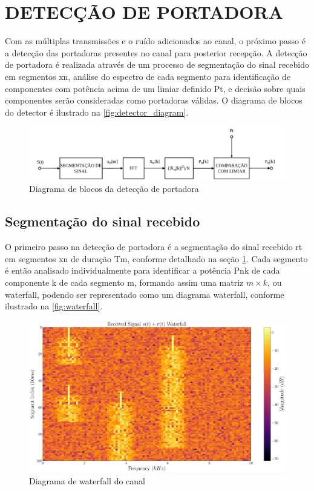 \section{DETECÇÃO DE PORTADORA}\label{sec:detector}

Com as múltiplas transmissões e o ruído adicionados ao canal, o próximo passo é a detecção das portadoras presentes no canal para posterior recepção. A detecção de portadora é realizada através de um processo de segmentação do sinal recebido em segmentos \gls{xn}, análise do espectro de cada segmento para identificação de componentes com potência acima de um limiar definido \gls{Pt}, e decisão sobre quais componentes serão consideradas como portadoras válidas. O diagrama de blocos do detector é ilustrado na \autoref{fig:detector_diagram}.

\begin{figure}[H]
	\centering
	\caption{Diagrama de blocos da detecção de portadora}\label{fig:detector_diagram}
	\includegraphics[width=\linewidth]{assets/diagrams/detector.pdf}
\end{figure}

\subsection{Segmentação do sinal recebido}\label{sec:segmentacao}

O primeiro passo na detecção de portadora é a segmentação do sinal recebido \gls{rt} em segmentos \gls{xn} de duração \gls{Tm}, conforme detalhado na seção \ref{sec:detector}. Cada segmento é então analisado individualmente para identificar a potência \gls{Pnk} de cada componente \gls{k} de cada segmento \gls{m}, formando assim uma matriz $m \times k$, ou \gls{waterfall}, podendo ser representado como um diagrama waterfall, conforme ilustrado na \autoref{fig:waterfall}.

\begin{figure}[H]
	\centering
	\caption{Diagrama de waterfall do canal}\label{fig:waterfall}
	\includegraphics[width=\linewidth]{assets/cap3/example_detector_waterfall.pdf}
\end{figure}

